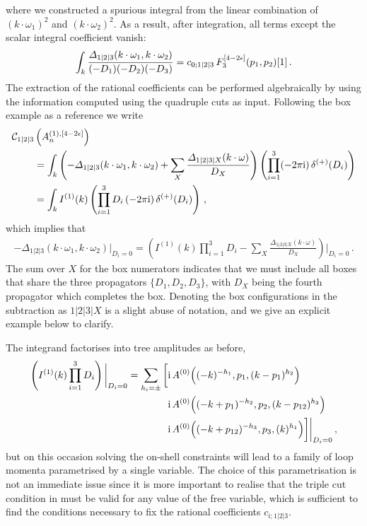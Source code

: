 where we constructed a spurious integral from the linear combination of $(k\cdot\omega_1)^2$ and $(k\cdot\omega_2)^2$.
As a result, after integration, all terms except the scalar integral coefficient vanish:
\begin{equation}
  \int_k \frac{\Delta_{1|2|3}(k\cdot\omega_1, k\cdot\omega_2)}{(-D_1) (-D_2) (-D_3)}  = c_{0;1|2|3} \, F^{[4-2\eps]}_3(p_1,p_2)[1] \,.
  \label{eq:Delta3integrated}
\end{equation}
The extraction of the rational coefficients can be performed algebraically by
using the information computed using the quadruple cuts as input. Following the
box example as a reference we write
\begin{align}
  \mathcal{C}_{1|2|3} & \left( A^{(1),[4-2\eps]}_n \right) \nonumber\\&
  = \int_k \left( -\Delta_{1|2|3}(k\cdot\omega_1, k\cdot\omega_2)  + \sum_X \frac{\Delta_{1|2|3|X}(k\cdot\omega)}{D_X} \right) \left(\prod_{i=1}^3 (-2\pi\i)\, \delta^{(+)}(D_i)\right) \nonumber\\&
  = \int_k I^{(1)}(k) \left(\prod_{i=1}^3 D_i \, (-2\pi\i)\, \delta^{(+)}(D_i) \right) \,,
\end{align}
which implies that
\begin{align}
  -\Delta_{1|2|3}(k\cdot\omega_1, k\cdot\omega_2) \bigg|_{D_i = 0} = \left( I^{(1)}(k) \prod_{i=1}^3 D_i - \sum_X \frac{\Delta_{1|2|3|X}(k\cdot\omega)}{D_X} \right) \bigg|_{D_i = 0} \,.
  \label{eq:triplecuteq}
\end{align}
The sum over $X$ for the box numerators indicates that we must include all
boxes that share the three propagators $\{D_1,D_2,D_3\}$, with $D_X$ being the
fourth propagator which completes the box.  Denoting the box configurations in
the subtraction as $1|2|3|X$ is a slight abuse of notation, and we give an
explicit example below to clarify.

The integrand factorises into tree amplitudes as before,
\begin{align} \begin{aligned}
  \left( I^{(1)}(k) \prod_{i=1}^3 D_i \right) \bigg|_{D_i = 0} = \sum_{h_i=\pm} \bigg[ &
   \mathrm{i} \, A^{(0)}\Bigl((-k)^{-h_1},p_1,(k-p_1)^{h_2} \Bigr) \\
   &  \mathrm{i} \, A^{(0)}\Bigl((-k+p_1)^{-h_2},p_2,(k-p_{12})^{h_3}\Bigr) \\
   &  \mathrm{i} \, A^{(0)}\Bigl((-k+p_{12})^{-h_3},p_3,(k)^{h_1}\Bigr) \bigg] \bigg|_{D_i = 0} \,,
\end{aligned} \end{align}
but on this occasion solving the on-shell constraints will lead to a family of
loop momenta parametrised by a single variable. The choice of this
parametrisation is not an immediate issue since it is more important to realise
that the triple cut condition in  must be valid
for any value of the free variable, which is sufficient to find the conditions
necessary to fix the rational coefficients $c_{i;1|2|3}$.

